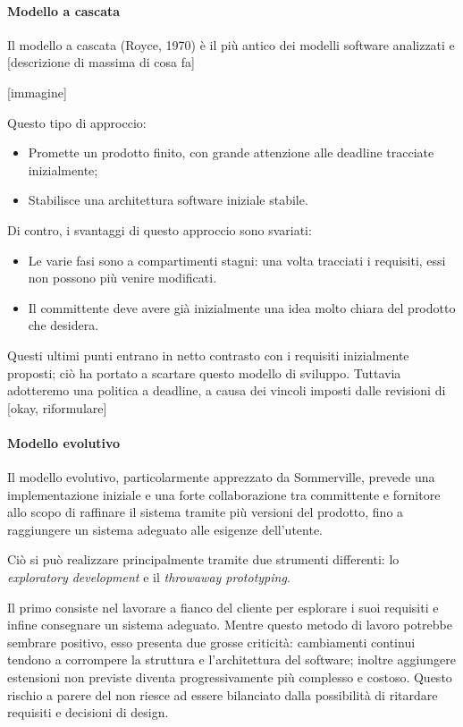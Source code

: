			\paragraph{Modello a cascata}

			Il modello a cascata (Royce, 1970) è il più antico dei modelli software analizzati e [descrizione di massima di cosa fa]

			[immagine]

			Questo tipo di approccio:
\begin{itemize}
\item Promette un prodotto finito, con grande attenzione alle deadline tracciate inizialmente;
\item Stabilisce una architettura software iniziale stabile.
\end{itemize}

			Di contro, i svantaggi di questo approccio sono svariati:
\begin{itemize}
\item Le varie fasi sono a compartimenti stagni: una volta tracciati i requisiti, essi non possono più venire modificati.
\item Il committente deve avere già inizialmente una idea molto chiara del prodotto che desidera. 
\end{itemize}

Questi ultimi punti entrano in netto contrasto con i requisiti inizialmente proposti; ciò ha portato a scartare questo modello di sviluppo. Tuttavia adotteremo una politica a deadline, a causa dei vincoli imposti dalle revisioni di {\TV} [okay, riformulare]

			\paragraph{Modello evolutivo}

			Il modello evolutivo, particolarmente apprezzato da Sommerville, prevede una implementazione iniziale e una forte collaborazione tra committente e fornitore allo scopo di raffinare il sistema tramite più versioni del prodotto, fino a raggiungere un sistema adeguato alle esigenze dell'utente.

Ciò si può realizzare principalmente tramite due strumenti differenti: lo \emph{exploratory development} e il \emph{throwaway prototyping}.

Il primo consiste nel lavorare a fianco del cliente per esplorare i suoi requisiti e infine consegnare un sistema adeguato. Mentre questo metodo di lavoro potrebbe sembrare positivo, esso presenta due grosse criticità: cambiamenti continui tendono a corrompere la struttura e l'architettura del software; inoltre aggiungere estensioni non previste diventa progressivamente più complesso e costoso. Questo rischio a parere del  non riesce ad essere bilanciato dalla possibilità di ritardare requisiti e decisioni di design.

